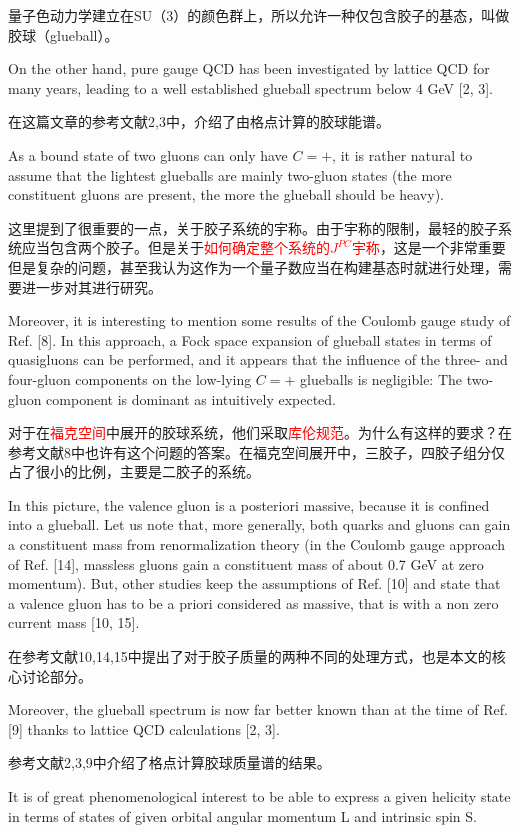 \documentclass{article}
\begin{document}
量子色动力学建立在SU（3）的颜色群上，所以允许一种仅包含胶子的基态，叫做胶球（glueball）。

On the other hand, pure gauge QCD has been investigated by lattice QCD for many years, leading to a well established glueball spectrum below 4 GeV [2, 3].

在这篇文章的参考文献2,3中，介绍了由格点计算的胶球能谱。

 As a bound state of two gluons can only have
$C = +$, it is rather natural to assume that the lightest glueballs are mainly two-gluon states (the more constituent gluons are present, the more the glueball should be heavy).

这里提到了很重要的一点，关于胶子系统的宇称。由于宇称的限制，最轻的胶子系统应当包含两个胶子。但是关于\textcolor{red}{如何确定整个系统的$J^{PC}$宇称}，这是一个非常重要但是复杂的问题，甚至我认为这作为一个量子数应当在构建基态时就进行处理，需要进一步对其进行研究。

 Moreover, it is interesting to mention some results of the Coulomb gauge study of Ref. [8]. In this approach, a Fock space expansion of glueball states in terms of quasigluons can be performed, and it appears that the influence of the three- and four-gluon components on the low-lying $C = +$ glueballs is negligible: The two-gluon component is dominant as intuitively expected.

对于在\textcolor{red}{福克空间}中展开的胶球系统，他们采取\textcolor{red}{库伦规范}。为什么有这样的要求？在参考文献8中也许有这个问题的答案。在福克空间展开中，三胶子，四胶子组分仅占了很小的比例，主要是二胶子的系统。


In this picture, the valence gluon is a posteriori massive, because it is confined into a glueball. Let us note that, more generally, both quarks and gluons can gain a constituent mass from renormalization theory (in the Coulomb gauge approach of Ref. [14], massless gluons gain a constituent mass of about 0.7 GeV at
zero momentum). But, other studies keep the assumptions of Ref. [10] and state that a valence gluon has to be a
priori considered as massive, that is with a non zero current mass [10, 15].

在参考文献10,14,15中提出了对于胶子质量的两种不同的处理方式，也是本文的核心讨论部分。

Moreover, the glueball spectrum
is now far better known than at the time of Ref. [9] thanks to lattice QCD calculations [2, 3].

参考文献2,3,9中介绍了格点计算胶球质量谱的结果。

It is of great phenomenological interest to be able to express a given helicity state in terms of states of given orbital angular momentum L and intrinsic spin S.
\end{document}
